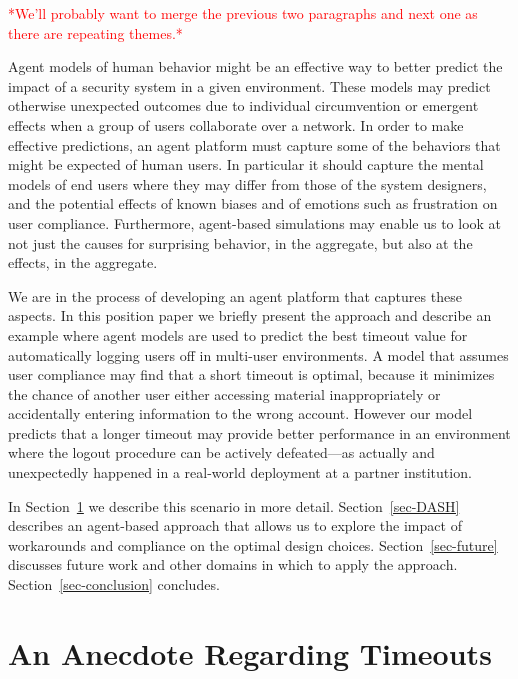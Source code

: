 \documentclass{acm_proc_article-sp}
\newcommand{\secref}[1] {Section~\ref{sec-#1}}
\begin{document}
\textcolor{red}{*We'll probably want to merge the previous two paragraphs and next one as there 
are repeating themes.*}

Agent models of human behavior might be an effective way to better
predict the impact of a security system in a given environment. These
models may predict otherwise unexpected outcomes due to individual
circumvention or emergent effects when a group of users collaborate
over a network. In order to make effective predictions, an agent
platform must capture some of the behaviors that might be expected of
human users. In particular it should capture the mental models of end
users where they may differ from those of the system designers, and
the potential effects of known biases and of emotions such as
frustration on user compliance.  Furthermore, agent-based simulations
may enable us to look at not just the causes for surprising behavior,
in the aggregate, but also at the effects, in the aggregate.

We are in the process of developing an agent platform that captures
these aspects. In this position paper we briefly present the approach
and describe an example where agent models are used to predict the
best timeout value for automatically logging users off in multi-user
environments.  A model that assumes user compliance may find that a
short timeout is optimal, because it minimizes the chance of another
user either accessing material inappropriately or accidentally
entering information to the wrong account. However our model predicts
that a longer timeout may provide better performance in an environment
where the logout procedure can be actively defeated---as actually and
unexpectedly happened in a real-world deployment at a partner
institution.

In \secref{timeouts} we describe this scenario in more
detail. \secref{DASH} describes an agent-based approach that allows us
to explore the impact of workarounds and compliance on the optimal
design choices. \secref{future} discusses future work and other
domains in which to apply the approach. \secref{conclusion} concludes.

\section{An Anecdote Regarding Timeouts}
\label{sec-timeouts}

\end{document}
